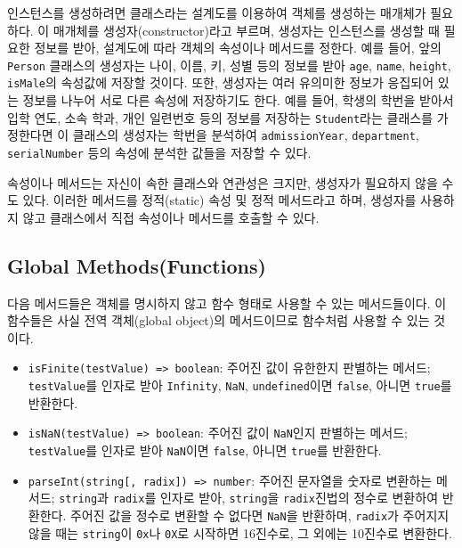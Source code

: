 인스턴스를 생성하려면 클래스라는 설계도를 이용하여 객체를 생성하는 매개체가 필요하다. 이 매개체를 생성자(constructor)라고 부르며, 생성자는 인스턴스를 생성할 때 필요한 정보를 받아, 설계도에 따라 객체의 속성이나 메서드를 정한다. 예를 들어, 앞의 \texttt{Person} 클래스의 생성자는 나이, 이름, 키, 성별 등의 정보를 받아 \texttt{age}, \texttt{name}, \texttt{height}, \texttt{isMale}의 속성값에 저장할 것이다. 또한, 생성자는 여러 유의미한 정보가 응집되어 있는 정보를 나누어 서로 다른 속성에 저장하기도 한다. 예를 들어, 학생의 학번을 받아서 입학 연도, 소속 학과, 개인 일련번호 등의 정보를 저장하는 \texttt{Student}라는 클래스를 가정한다면 이 클래스의 생성자는 학번을 분석하여 \texttt{admissionYear}, \texttt{department}, \texttt{serialNumber} 등의 속성에 분석한 값들을 저장할 수 있다.

속성이나 메서드는 자신이 속한 클래스와 연관성은 크지만, 생성자가 필요하지 않을 수도 있다. 이러한 메서드를 정적(static) 속성 및 정적 메서드라고 하며, 생성자를 사용하지 않고 클래스에서 직접 속성이나 메서드를 호출할 수 있다.
\pagebreak

\subsection*{Global Methods(Functions)}

다음 메서드들은 객체를 명시하지 않고 함수 형태로 사용할 수 있는 메서드들이다. 이 함수들은 사실 전역 객체(global object)의 메서드이므로 함수처럼 사용할 수 있는 것이다.

\begin{itemize}
    \item \texttt{isFinite(testValue) => boolean}: 주어진 값이 유한한지 판별하는 메서드; \texttt{testValue}를 인자로 받아 \texttt{Infinity}, \texttt{NaN}, \texttt{undefined}이면 \texttt{false}, 아니면 \texttt{true}를 반환한다.
    \item \texttt{isNaN(testValue) => boolean}: 주어진 값이 \texttt{NaN}인지 판별하는 메서드; \texttt{testValue}를 인자로 받아 \texttt{NaN}이면 \texttt{false}, 아니면 \texttt{true}를 반환한다.
    \item \texttt{parseInt(string[, radix]) => number}: 주어진 문자열을 숫자로 변환하는 메서드; \texttt{string}과 \texttt{radix}를 인자로 받아, \texttt{string}을 \texttt{radix}진법의 정수로 변환하여 반환한다. 주어진 값을 정수로 변환할 수 없다면 \texttt{NaN}을 반환하며, \texttt{radix}가 주어지지 않을 때는 \texttt{string}이 \texttt{0x}나 \texttt{0X}로 시작하면 16진수로, 그 외에는 10진수로 변환한다.
\end{itemize}

